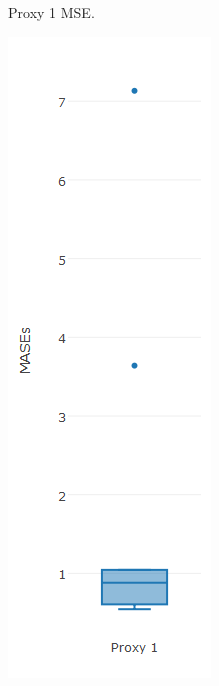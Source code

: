 \begin{figure}[!h]
{\begin{subfigure}{.25\linewidth}
  \caption{Proxy 1 MSE.}
  \label{fig:bp2.1}
\end{subfigure}%
\begin{subfigure}{.25\linewidth}
  \centering
  \includegraphics[width=\linewidth]{img/10ysigmaMasebp.png}

\end{subfigure}}
\end{figure}
